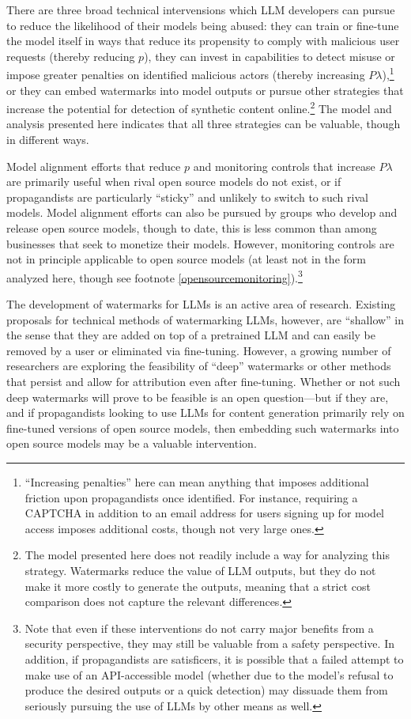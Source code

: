 \documentclass{article}
\begin{document}
There are three broad technical intervensions which LLM developers can pursue to reduce the likelihood of their models being abused: they can train or fine-tune the model itself in ways that reduce its propensity to comply with malicious user requests (thereby reducing $p$), they can invest in capabilities to detect misuse or impose greater penalties on identified malicious actors (thereby increasing $P\lambda$),\footnote{``Increasing penalties'' here can mean anything that imposes additional friction upon propagandists once identified. For instance, requiring a CAPTCHA in addition to an email address for users signing up for model access imposes additional costs, though not very large ones.} or they can embed watermarks into model outputs or pursue other strategies that increase the potential for detection of synthetic content online.\footnote{The model presented here does not readily include a way for analyzing this strategy. Watermarks reduce the value of LLM outputs, but they do not make it more costly to generate the outputs, meaning that a strict cost comparison does not capture the relevant differences.} The model and analysis presented here indicates that all three strategies can be valuable, though in different ways.

Model alignment efforts that reduce $p$ and monitoring controls that increase $P\lambda$ are primarily useful when rival open source models do not exist, or if propagandists are particularly ``sticky'' and unlikely to switch to such rival models. Model alignment efforts can also be pursued by groups who develop and release open source models, though to date, this is less common than among businesses that seek to monetize their models. However, monitoring controls are not in principle applicable to open source models (at least not in the form analyzed here, though see footnote \ref{opensourcemonitoring}).\footnote{Note that even if these interventions do not carry major benefits from a security perspective, they may still be valuable from a safety perspective. In addition, if propagandists are satisficers, it is possible that a failed attempt to make use of an API-accessible model (whether due to the model's refusal to produce the desired outputs or a quick detection) may dissuade them from seriously pursuing the use of LLMs by other means as well.}

The development of watermarks for LLMs is an active area of research. Existing proposals for technical methods of watermarking LLMs, however, are ``shallow'' in the sense that they are added on top of a pretrained LLM and can easily be removed by a user or eliminated via fine-tuning. \cite{watermark} However, a growing number of researchers are exploring the feasibility of ``deep'' watermarks or other methods that persist and allow for attribution even after fine-tuning. \cite{deepwatermark, attribution, competition} Whether or not such deep watermarks will prove to be feasible is an open question—but if they are, and if propagandists looking to use LLMs for content generation primarily rely on fine-tuned versions of open source models, then embedding such watermarks into open source models may be a valuable intervention. 
\end{document}
